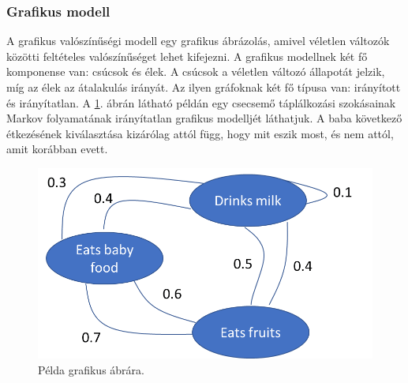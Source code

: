 


\subsubsection{Grafikus modell}

A grafikus valószínűségi modell egy grafikus ábrázolás, amivel véletlen változók közötti feltételes valószínűséget lehet kifejezni. A grafikus modellnek két fő komponense van: csúcsok és élek. A csúcsok a véletlen változó állapotát jelzik, míg az élek az átalakulás irányát. Az ilyen gráfoknak két fő típusa van: irányított és irányítatlan. A \ref{fig:graph}. ábrán látható példán egy csecsemő táplálkozási szokásainak Markov folyamatának irányítatlan grafikus modelljét láthatjuk. A baba következő étkezésének kiválasztása kizárólag attól függ, hogy mit eszik most, és nem attól, amit korábban evett.

\begin{figure}[ht]
	\centering
	\includegraphics[width=0.7\columnwidth]{figures/graph_example.png}
	\caption{Példa grafikus ábrára.}
	\label{fig:graph}
\end{figure}

